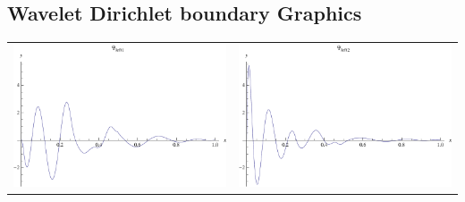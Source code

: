 \documentclass{article}
\begin{document}
\begin{landscape}
\subsection{Wavelet Dirichlet boundary Graphics}
\begin{tabular}{cc}
\includegraphics[width=10.cm]{decic_wavelet_dleft_1.pdf}& \includegraphics[width=10.cm]{decic_wavelet_dleft_2.pdf} \\
\end{tabular} 
 \\ 
\begin{tabular}{cc}

\end{tabular}
\end{landscape}
\end{document}
